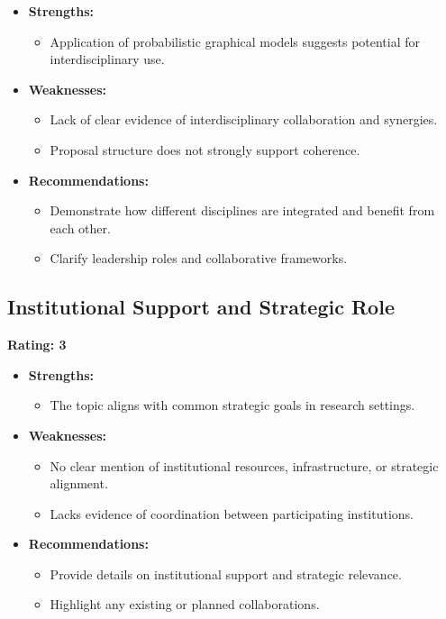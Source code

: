 \documentclass{article}
\begin{document}
\begin{itemize}
    \item \textbf{Strengths:} 
    \begin{itemize}
        \item Application of probabilistic graphical models suggests potential for interdisciplinary use.
    \end{itemize}
    \item \textbf{Weaknesses:} 
    \begin{itemize}
        \item Lack of clear evidence of interdisciplinary collaboration and synergies.
        \item Proposal structure does not strongly support coherence.
    \end{itemize}
    \item \textbf{Recommendations:}
    \begin{itemize}
        \item Demonstrate how different disciplines are integrated and benefit from each other.
        \item Clarify leadership roles and collaborative frameworks.
    \end{itemize}
\end{itemize}

\subsection{Institutional Support and Strategic Role}
\textbf{Rating: 3}

\begin{itemize}
    \item \textbf{Strengths:} 
    \begin{itemize}
        \item The topic aligns with common strategic goals in research settings.
    \end{itemize}
    \item \textbf{Weaknesses:} 
    \begin{itemize}
        \item No clear mention of institutional resources, infrastructure, or strategic alignment.
        \item Lacks evidence of coordination between participating institutions.
    \end{itemize}
    \item \textbf{Recommendations:}
    \begin{itemize}
        \item Provide details on institutional support and strategic relevance.
        \item Highlight any existing or planned collaborations.
    \end{itemize}
\end{itemize}
\end{document}
